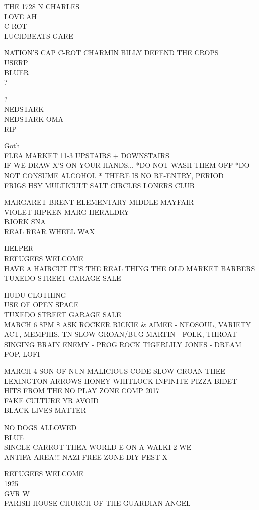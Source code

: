 \documentclass[10pt,letterpaper]{article}
\begin{document}
THE 1728 N CHARLES\\
LOVE AH\\
C{-}ROT\\
LUCIDBEATS GARE

NATION'S CAP C{-}ROT CHARMIN BILLY DEFEND THE CROPS\\
USERP\\
BLUER\\
?

?\\
NEDSTARK\\
NEDSTARK OMA\\
RIP

Goth\\
FLEA MARKET 11{-}3 UPSTAIRS + DOWNSTAIRS\\
IF WE DRAW X'S ON YOUR HANDS... *DO NOT WASH THEM OFF *DO NOT CONSUME ALCOHOL * THERE IS NO RE{-}ENTRY, PERIOD\\
FRIGS HSY MULTICULT SALT CIRCLES LONERS CLUB

MARGARET BRENT ELEMENTARY MIDDLE MAYFAIR\\
VIOLET RIPKEN MARG HERALDRY\\
BJORK SNA\\
REAL REAR WHEEL WAX

HELPER\\
REFUGEES WELCOME\\
HAVE A HAIRCUT IT'S THE REAL THING THE OLD MARKET BARBERS\\
TUXEDO STREET GARAGE SALE

HUDU CLOTHING\\
USE OF OPEN SPACE\\
TUXEDO STREET GARAGE SALE\\
MARCH 6 8PM \$ ASK ROCKER RICKIE \& AIMEE {-} NEOSOUL, VARIETY ACT, MEMPHIS, TN SLOW GROAN/BUG MARTIN {-} FOLK, THROAT SINGING BRAIN ENEMY {-} PROG ROCK TIGERLILY JONES {-} DREAM POP, LOFI

MARCH 4 SON OF NUN MALICIOUS CODE SLOW GROAN THEE LEXINGTON ARROWS HONEY WHITLOCK INFINITE PIZZA BIDET\\
HITS FROM THE NO PLAY ZONE COMP 2017\\
FAKE CULTURE YR AVOID\\
BLACK LIVES MATTER

NO DOGS ALLOWED\\
BLUE\\
SINGLE CARROT THEA WORLD E ON A WALKI 2 WE\\
ANTIFA AREA!!! NAZI FREE ZONE DIY FEST X

REFUGEES WELCOME\\
1925\\
GVR W\\
PARISH HOUSE CHURCH OF THE GUARDIAN ANGEL
\end{document}
